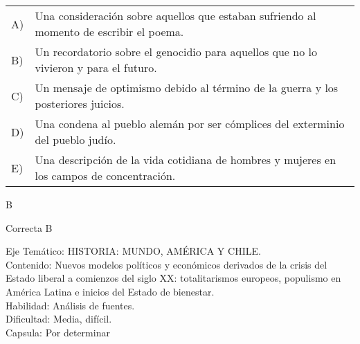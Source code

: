 \documentclass[letterpaper,11pt]{article}
\newcommand{\anchopregunta}{0.9\textwidth}
\begin{document}
\begin{enumerate}
\begin{minipage}{\anchopregunta}
\begin{flushleft}\begin{tabular}{@{\hspace{-.001\textwidth}}l@{\hspace{2pt}}p{}}
A)& Una consideración sobre aquellos que estaban sufriendo al momento de escribir el poema.\\
B)& Un recordatorio sobre el genocidio para aquellos que no lo vivieron y para el futuro.\\
C)& Un mensaje de optimismo debido al término de la guerra y los posteriores juicios.\\
D)& Una condena al pueblo alemán por ser cómplices del exterminio del pueblo judío.\\
E)& Una descripción de la vida cotidiana de hombres y mujeres en los campos de concentración.\\ 
\end{tabular}\end{flushleft}%
\begin{key} B
\end{key} 
\begin{hint}
\end{hint}
\begin{answer} Correcta B \\
\end{answer}
\begin{info} %
\begin{flushleft}
Eje Temático: HISTORIA: MUNDO, AMÉRICA Y CHILE.\\
Contenido: Nuevos modelos políticos y económicos derivados de la crisis del Estado liberal a comienzos del siglo XX: totalitarismos europeos, populismo en América Latina e inicios del Estado de bienestar.\\
Habilidad: Análisis de fuentes.\\
Dificultad: Media, difícil.\\
Capsula: Por determinar \\
\end{flushleft} 
\end{info}
\end{minipage}\vfill$\;$ %


\end{enumerate}
\end{document}
